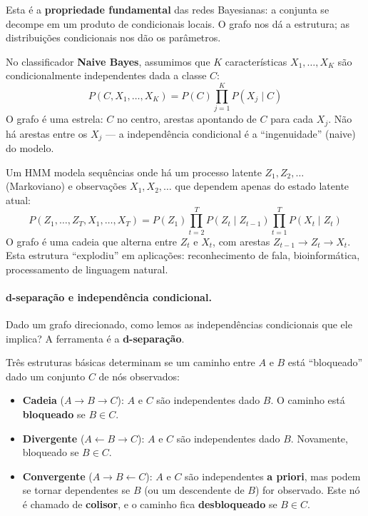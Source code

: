 \documentclass{tufte-handout}
\begin{document}
Esta é a \textbf{propriedade fundamental} das redes Bayesianas: a conjunta se decompe em um produto de condicionais locais. O grafo nos dá a estrutura; as distribuições condicionais nos dão os parâmetros.

\begin{exmp}
    No classificador \textbf{Naive Bayes}, assumimos que $K$ características $X_1,\dots,X_K$ são condicionalmente independentes dada a classe $C$:
    \[
    P(C, X_1, \dots, X_K) = P(C) \prod_{j=1}^K P(X_j \mid C)
    \]
    O grafo é uma estrela: $C$ no centro, arestas apontando de $C$ para cada $X_j$. Não há arestas entre os $X_j$ --- a independência condicional é a ``ingenuidade'' (naive) do modelo.
\end{exmp}

\begin{exmp}
    Um HMM modela sequências onde há um processo latente $Z_1, Z_2, \dots$ (Markoviano) e observações $X_1, X_2, \dots$ que dependem apenas do estado latente atual:
    \[
    P(Z_1, \dots, Z_T, X_1, \dots, X_T) = P(Z_1) \prod_{t=2}^T P(Z_t \mid Z_{t-1}) \prod_{t=1}^T P(X_t \mid Z_t)
    \]
    O grafo é uma cadeia que alterna entre $Z_t$ e $X_t$, com arestas $Z_{t-1} \to Z_t \to X_t$. Esta estrutura ``explodiu'' em aplicações: reconhecimento de fala, bioinformática, processamento de linguagem natural.
\end{exmp}

\paragraph{d-separação e independência condicional.}

Dado um grafo direcionado, como lemos as independências condicionais que ele implica? A ferramenta é a \textbf{d-separação}.

Três estruturas básicas determinam se um caminho entre $A$ e $B$ está ``bloqueado'' dado um conjunto $C$ de nós observados:

\begin{itemize}
    \item \textbf{Cadeia} ($A \to B \to C$): $A$ e $C$ são independentes dado $B$. O caminho está \textbf{bloqueado} se $B \in C$.
    \item \textbf{Divergente} ($A \leftarrow B \to C$): $A$ e $C$ são independentes dado $B$. Novamente, bloqueado se $B \in C$.
    \item \textbf{Convergente} ($A \to B \leftarrow C$): $A$ e $C$ são independentes \textbf{a priori}, mas podem se tornar dependentes se $B$ (ou um descendente de $B$) for observado. Este nó é chamado de \textbf{colisor}, e o caminho fica \textbf{desbloqueado} se $B \in C$.
\end{itemize}
\end{document}
